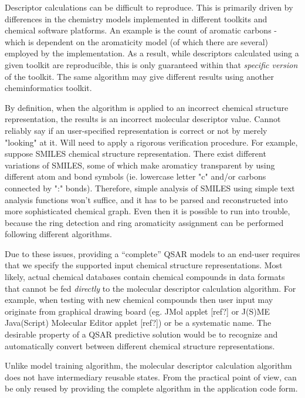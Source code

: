 \documentclass[12pt,letterpaper]{article}
\begin{document}
Descriptor calculations can be difficult to reproduce. This is
primarily driven by differences in the chemistry models implemented in
different toolkits and chemical software platforms. An example is the
count of aromatic carbons - which is dependent on the aromaticity
model (of which there are several) employed by the implementation. As
a result, while descriptors calculated using a given toolkit are
reproducible, this is only guaranteed within that \emph{specific
  version} of the toolkit. The same algorithm may give different
results using another cheminformatics toolkit.

By definition, when the algorithm
is applied to an incorrect chemical structure representation, the
results is an incorrect molecular descriptor value. Cannot reliably
say if an user-specified representation is correct or not by merely
"looking" at it. Will need to apply a rigorous verification
procedure. For example, suppose SMILES chemical structure
representation.  There exist different variations of SMILES, some of
which make aromaticy transparent by using different atom and bond
symbols (ie. lowercase letter "c" and/or carbons connected by ":"
bonds). Therefore, simple analysis of SMILES using simple text
analysis functions won't suffice, and it has to be parsed and
reconstructed into more sophisticated chemical graph. Even then it is
possible to run into trouble, because the ring detection and ring
aromaticity assignment can be performed following different
algorithms.

Due to these issues,
providing a ``complete'' QSAR models to an end-user requires that we
specify the supported input chemical structure representations. Most
likely, actual chemical databases contain chemical compounds in data
formats that cannot be fed \emph{directly} to the molecular descriptor
calculation algorithm. For example, when testing with new chemical
compounds then user input may originate from graphical drawing board
(eg. JMol applet [ref?] or J(S)ME Java(Script) Molecular Editor applet
[ref?]) or be a systematic name. The desirable property of a QSAR
predictive solution would be to recognize and automatically convert
between different chemical structure representations.

Unlike model training algorithm, the molecular descriptor calculation
algorithm does not have intermediary reusable states. From the practical
point of view, can be only reused by providing the complete algorithm in 
the application code form.
\end{document}
